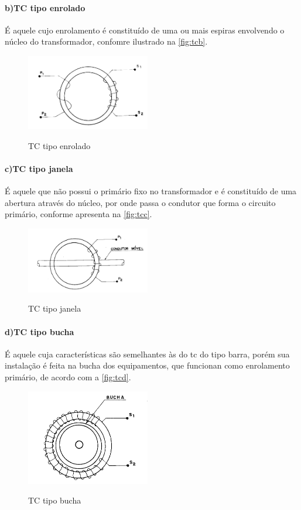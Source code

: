 \documentclass[a5paper,english,spanish,brazil]{ufsc-thesis}
\begin{document}
				\paragraph*{b)\indent TC tipo enrolado}
					É aquele cujo enrolamento é constituído de uma ou mais espiras envolvendo o núcleo do transformador, confomre ilustrado na \autoref{fig:tcb}.
					\begin{figure}[htb]
						\caption{TC tipo enrolado}
						\centering
						\includegraphics[width=5.4cm]{TC(2).png}
						\label{fig:tcb}
					\end{figure}
				\paragraph*{c)\indent TC tipo janela}
					É aquele que não possui o primário fixo no transformador e é constituído de uma abertura através do núcleo, por onde passa o condutor que forma o circuito primário, conforme apresenta na \autoref{fig:tcc}.
					\begin{figure}[htb]
						\caption{TC tipo janela}
						\centering
						\includegraphics[width=5.4cm]{TC(3).png}
						\label{fig:tcc}
					\end{figure}
				\paragraph*{d)\indent TC tipo bucha}
					É aquele cuja características são semelhantes às do tc do tipo barra, porém sua instalação é feita na bucha dos equipamentos, que funcionan como enrolamento primário, de acordo com a \autoref{fig:tcd}.
					\begin{figure}[htb]
						\caption{TC tipo bucha}
						\centering
						\includegraphics[width=5.4cm]{TC(4).png}
						\label{fig:tcd}
					\end{figure}
\end{document}
